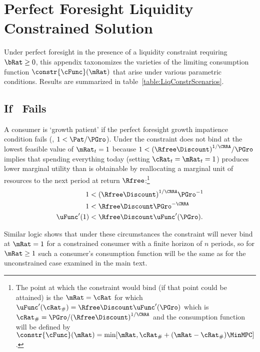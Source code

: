 \documentclass[\econtexRoot/BufferStockTheory]{subfiles}
\begin{document}
\let\TableWidth\relax
{\newlength\TableWidth}

\section{Perfect Foresight Liquidity Constrained Solution}\label{sec:ApndxLiqConstr}

Under perfect foresight in the presence of a liquidity constraint requiring $\bRat
\geq 0$, this appendix taxonomizes the varieties of the limiting
consumption function $\constr{\cFunc}(\mRat)$ that arise under various parametric conditions.  Results are summarized in table~\ref{table:LiqConstrScenarios}.



\subsection{If \GICRaw~Fails}

A consumer is `growth patient' if the perfect foresight growth
impatience condition fails (\cncl{\GICRaw}, $1 < \Pat/\PGro$).  Under
\cncl{\GICRaw} the constraint does not bind at the lowest feasible value of $\mRat_{t}=1$ because
$1 < {(\Rfree\Discount)}^{1/\CRRA}/\PGro$ implies that spending
everything today (setting $\cRat_{t}=\mRat_{t}=1$) produces lower
marginal utility than is obtainable by reallocating a marginal unit of
resources to the next period at return $\Rfree$:\footnote{The point at
  which the constraint would bind (if that point could be attained) is
  the $\mRat=\cRat$ for which $\uFunc^{\prime}(\cRat_{\#}) = \Rfree
  \Discount \uFunc^{\prime}(\PGro)$ which is $\cRat_{\#} =
  \PGro/{(\Rfree \Discount)}^{1/\CRRA}$ and the consumption function
  will be defined by
  $\constr{\cFunc}(\mRat)=\min[\mRat,\cRat_{\#}+(\mRat-\cRat_{\#})\MinMPC
  ]$.}
\begin{equation}\begin{gathered}\begin{aligned}
  1  & < {(\Rfree \Discount)}^{1/\CRRA}\PGro^{-1}    \notag
  \\ 1  & < \Rfree \Discount \PGro^{-\CRRA} \notag
  \\  \uFunc^{\prime}(1)  & < \Rfree \Discount \uFunc^{\prime}(\PGro)   \label{eq:EulerGICRawFailsEnd}.
\end{aligned}\end{gathered}\end{equation}

Similar logic shows that under these circumstances the constraint will
never bind at $\mRat=1$ for a constrained consumer with a finite horizon of $n$
periods, so for $\mRat \geq 1$ such a consumer's consumption function will be the same as for the
unconstrained case examined in the main text.
\end{document}
